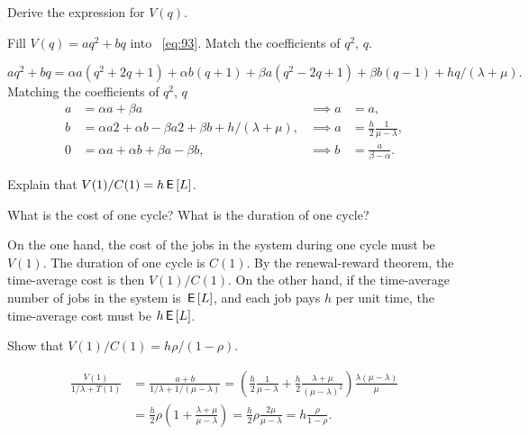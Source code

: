 \begin{exercise}\label{ex:nmm-2}
Derive the expression for $V(q)$.
\begin{hint}
  Fill $V(q) = aq^2 + bq$ into ~\cref{eq:93}. Match the coefficients of $q^2$, $q$.
\end{hint}
\begin{solution}
  \begin{equation*}
    aq^2 + b q = \alpha a (q^2 + 2q + 1) + \alpha b (q+1) + \beta a (q^2 - 2q + 1) + \beta b (q - 1) + hq/(\lambda + \mu).
  \end{equation*}
  Matching the coefficients of $q^2$, $q$
  \begin{align*}
    a &= \alpha a + \beta a &\implies a &= a, \\
    b &= \alpha a 2 + \alpha b - \beta a 2 + \beta b + h/(\lambda + \mu), & \implies a &= \frac h 2 \frac 1 {\mu -\lambda},\\
    0 &= \alpha a + \alpha b + \beta a - \beta b, & \implies b &= \frac a {\beta - \alpha}.
  \end{align*}
\end{solution}
\end{exercise}

\begin{exercise}\label{ex:nmm5}
Explain that $V(1)/C(1) = h \,\mathsf{E}\left[L\right]$.
\begin{hint}
  What is the cost of one cycle? What is the duration of one cycle?
\end{hint}
\begin{solution}
  On the one hand, the cost of the jobs in the system during one cycle must be $V(1)$.
  The duration of one cycle is $C(1)$.
  By the renewal-reward theorem, the time-average cost is then $V(1)/C(1)$.
  On the other hand, if the time-average number of jobs in the system is $\,\mathsf{E}\left[L\right]$, and each job pays $h$ per unit time, the time-average cost must be $h \,\mathsf{E}\left[L\right]$.
\end{solution}
\end{exercise}

\begin{exercise}\label{ex:62}
Show that $V(1)/C(1) = h \rho/(1-\rho).$
\begin{solution}
\begin{align*}
  \frac{V(1)}{1/\lambda + T(1)}
  &= \frac{a+b}{1/\lambda + 1/(\mu-\lambda)}
= \left(\frac h 2 \frac 1 {\mu -\lambda} + \frac h 2 \frac{\lambda + \mu}{(\mu - \lambda)^2}\right)\frac{\lambda(\mu-\lambda)}{\mu}\\
&=\frac{h}2 \rho \left(1 + \frac{\lambda+\mu}{\mu-\lambda}\right) = \frac{h}{2} \rho \frac{2\mu}{\mu-\lambda}  = h \frac{\rho}{1-\rho}.
\end{align*}
\end{solution}
\end{exercise}


